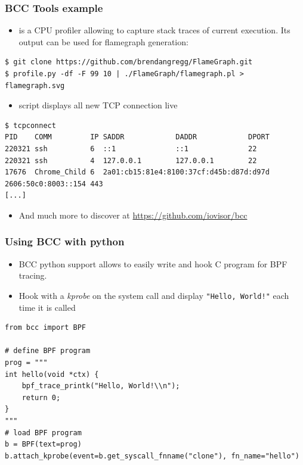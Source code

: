 \begin{frame}[fragile]
  \frametitle{BCC Tools example}
  \begin{itemize}
    \item {} is a CPU profiler allowing to capture stack traces of
          current execution. Its output can be used for flamegraph generation:
  \end{itemize}
  \begin{block}{}
    \begin{verbatim}
$ git clone https://github.com/brendangregg/FlameGraph.git
$ profile.py -df -F 99 10 | ./FlameGraph/flamegraph.pl > flamegraph.svg
    \end{verbatim}
  \end{block}
  \begin{itemize}
    \item {} script displays all new TCP connection live
  \end{itemize}
  \begin{block}{}
    \begin{verbatim}
$ tcpconnect
PID    COMM         IP SADDR            DADDR            DPORT
220321 ssh          6  ::1              ::1              22   
220321 ssh          4  127.0.0.1        127.0.0.1        22   
17676  Chrome_Child 6  2a01:cb15:81e4:8100:37cf:d45b:d87d:d97d 2606:50c0:8003::154 443  
[...]
    \end{verbatim}
  \end{block}
  \begin{itemize}
    \item And much more to discover at \url{https://github.com/iovisor/bcc}
  \end{itemize}
\end{frame}

\begin{frame}[fragile]
  \frametitle{Using BCC with python}
  \begin{itemize}
    \item BCC python support allows to easily write and hook C program for BPF
          tracing.
    \item Hook with a {\em kprobe} on the  system call and display \verb+"Hello, World!"+ each
          time it is called
  \end{itemize}
  \begin{block}{}
    \begin{verbatim}
from bcc import BPF

# define BPF program
prog = """
int hello(void *ctx) {
    bpf_trace_printk("Hello, World!\\n");
    return 0;
}
"""
# load BPF program
b = BPF(text=prog)
b.attach_kprobe(event=b.get_syscall_fnname("clone"), fn_name="hello")
    \end{verbatim}
  \end{block}
\end{frame}

